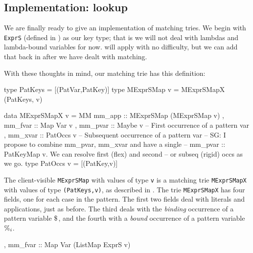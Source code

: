 \documentclass[acmsmall]{acmart}
\theoremstyle{theorem}
\theoremstyle{definition}
\theoremstyle{remark}
\begin{document}
\subsection{Implementation: lookup} \label{sec:matching-lookup}

We are finally ready to give an implementation of matching tries.
We begin with \lstinline{ExprS} (defined in ) as our key type;
that is we will not deal with lambdas and lambda-bound variables for now.
 will apply with no difficulty, but we can add that back
in after we have dealt with matching.

With these thoughts in mind, our matching trie has this definition:
\begin{code}
type PatKeys     = [(PatVar,PatKey)]
type MExprSMap v = MExprSMapX (PatKeys, v)

data MExprSMapX v
    = MM { mm_app  :: MExprSMap (MExprSMap v)
         , mm_fvar :: Map Var v
         , mm_pvar :: Maybe v     -- First occurrence of a pattern var
         , mm_xvar :: PatOccs v   -- Subsequent occurrence of a pattern var
             -- SG: I propose to combine mm_pvar, mm_xvar and have a single
             -- mm_pvar :: PatKeyMap v. We can resolve first (flex) and second
             -- or subseq (rigid) occs as we go.
       }
type PatOccs v = [(PatKey,v)]
\end{code}
The client-visible \lstinline{MExprSMap} with values of type \lstinline{v}
is a matching trie \lstinline{MExprSMapX} with values of type \lstinline{(PatKeys,v)},
as described in .
The trie \lstinline{MExprSMapX} has four fields, one for each case in the pattern.
The first two fields deal with literals and applications, just as before. The third deals with the \emph{binding} occurrence
of a pattern variable $\$_{}$, and the fourth with a \emph{bound} occurrence of
a pattern variable $\%_{i}$.

\begin{code}
         , mm_fvar :: Map Var (ListMap ExprS v)
\end{code}
\end{document}
